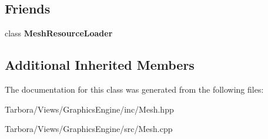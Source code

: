 \subsection*{Friends}
\begin{DoxyCompactItemize}
\item 
\mbox{\label{classTarbora_1_1Mesh_a27c9226be711b1d4d1e81ab76c541bf2}} 
class {\bfseries Mesh\+Resource\+Loader}
\end{DoxyCompactItemize}
\subsection*{Additional Inherited Members}


The documentation for this class was generated from the following files\+:\begin{DoxyCompactItemize}
\item 
Tarbora/\+Views/\+Graphics\+Engine/inc/Mesh.\+hpp\item 
Tarbora/\+Views/\+Graphics\+Engine/src/Mesh.\+cpp\end{DoxyCompactItemize}
